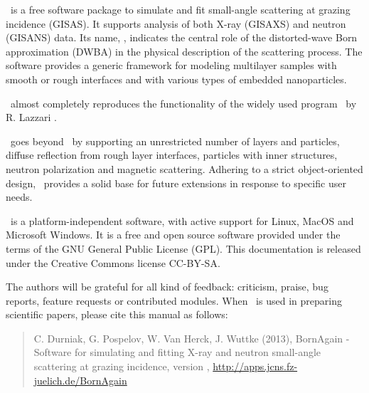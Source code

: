 \newpage
{}


\BornAgain\ is a free software package to simulate and fit small-angle
scattering at grazing incidence (GISAS). 
It supports analysis of both  X-ray (GISAXS) and neutron (GISANS) data.
Its name, \BornAgain, indicates the central role of the distorted-wave Born
approximation (DWBA) in the physical description of the
scattering process. The software provides a generic framework for modeling multilayer samples with smooth or
rough interfaces and with various types of embedded nano\-particles.

\BornAgain\ almost completely reproduces the functionality
of the widely used program \IsGISAXS\
by R. Lazzari \cite{Laz02}.

\BornAgain\ goes beyond \IsGISAXS\ by
supporting an unrestricted number of layers and particles, 
diffuse reflection from rough layer interfaces,
particles with inner structures, neutron polarization and magnetic scattering.
Adhering to a strict object-oriented design,
\BornAgain\ provides a solid base for future extensions
in response to specific user needs.

\BornAgain\ is a platform-independent software,
with active support for Linux, MacOS and 
Microsoft Windows. 
It is a free and open source software provided under the terms
of the GNU General Public License (GPL).
This documentation is released under the Creative Commons license CC-BY-SA.

The authors will be grateful for all kind of
feedback: criticism, praise, bug reports, feature requests
or contributed modules.
When \BornAgain\ is used in preparing scientific papers,
please cite this manual as follows: 
\begin{quote}
C. Durniak, G. Pospelov, W. Van Herck, J. Wuttke (2013),\newline
BornAgain - Software for simulating and fitting
X-ray and neutron small-angle scattering at grazing incidence,
version \UserManualVersionNumber,\newline
\url{http://apps.jcns.fz-juelich.de/BornAgain}
\end{quote}

